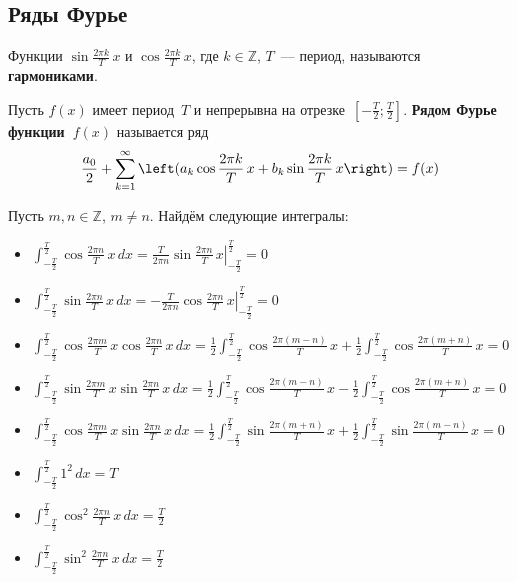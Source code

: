 \subsection{Ряды Фурье}
 Функции $\sin \frac{2\pi k}T\,x$ и $\cos \frac{2\pi k}T\,x$, где $k \in \mathbb Z$, $T$~--- период, называются \textbf{гармониками}.

Пусть $f(x)$ имеет период~$T$ и непрерывна на отрезке~$\left[ -\frac{T}2; \frac{T}2 \right]$.
 \textbf{Рядом Фурье функции~$f(x)$} называется ряд
\begin{equation}
\label{eq:Fourier_series}
\frac{a_0}2 + \series \left( a_k \cos \frac{2\pi k}T\,x + b_k \sin \frac{2\pi k}T\,x \right) = f(x)
\end{equation}

Пусть $m, n \in \mathbb Z$, $m \neq n$.
Найдём следующие интегралы:
\begin{itemize}
	\item $\displaystyle \int_{-\frac{T}2}^{\frac{T}2} \cos \frac{2 \pi n}T\,x\,dx =
	\frac{T}{2 \pi n} \left. \sin \frac{2 \pi n}T\,x \right|_{-\frac{T}2}^{\frac{T}2} = 0$
	
	\item $\displaystyle \int_{-\frac{T}2}^{\frac{T}2} \sin \frac{2 \pi n}T\,x\,dx =
	-\frac{T}{2 \pi n} \left. \cos \frac{2 \pi n}T\,x \right|_{-\frac{T}2}^{\frac{T}2} = 0$
	
	\item $\displaystyle \int_{-\frac{T}2}^{\frac{T}2} \cos \frac{2 \pi m}T\,x \cos \frac{2 \pi n}T\,x\,dx =
	\frac12 \int_{-\frac{T}2}^{\frac{T}2} \cos \frac{2 \pi (m - n)}T\,x +
	\frac12 \int_{-\frac{T}2}^{\frac{T}2} \cos \frac{2 \pi (m + n)}T\,x = 0$
	
	\item $\displaystyle \int_{-\frac{T}2}^{\frac{T}2} \sin \frac{2 \pi m}T\,x \sin \frac{2 \pi n}T\,x\,dx =
	\frac12 \int_{-\frac{T}2}^{\frac{T}2} \cos \frac{2 \pi (m - n)}T\,x -
	\frac12 \int_{-\frac{T}2}^{\frac{T}2} \cos \frac{2 \pi (m + n)}T\,x = 0$
	
	\item $\displaystyle \int_{-\frac{T}2}^{\frac{T}2} \cos \frac{2 \pi m}T\,x \sin \frac{2 \pi n}T\,x\,dx =
	\frac12 \int_{-\frac{T}2}^{\frac{T}2} \sin \frac{2 \pi (m + n)}T\,x +
	\frac12 \int_{-\frac{T}2}^{\frac{T}2} \sin \frac{2 \pi (m - n)}T\,x = 0$
	
	\item $\displaystyle \int_{-\frac{T}2}^{\frac{T}2} 1^2\,dx = T$
	
	\item $\displaystyle \int_{-\frac{T}2}^{\frac{T}2} \cos^2 \frac{2 \pi n}T\,x\,dx = \frac{T}2$
	
	\item $\displaystyle \int_{-\frac{T}2}^{\frac{T}2} \sin^2 \frac{2 \pi n}T\,x\,dx = \frac{T}2$
\end{itemize}

